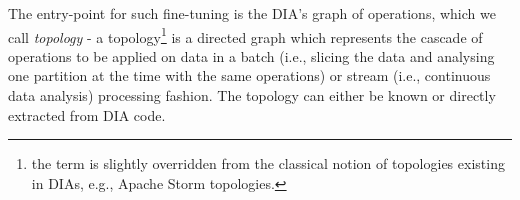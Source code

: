 The entry-point for such fine-tuning is the DIA's graph of operations, which we call \emph{topology} - a topology\footnote{the term is slightly overridden from the classical notion of topologies existing in DIAs, e.g., Apache Storm topologies.} is a directed graph which represents the cascade of operations to be applied on data in a batch (i.e., slicing the data and analysing one partition at the time with the same operations) or stream (i.e., continuous data analysis) processing fashion. The topology can either be known or directly extracted from DIA code.
%
%
%

